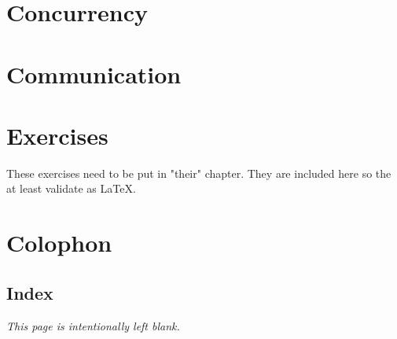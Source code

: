 \documentclass[a4paper,twoside,openleft]{blocksbook}
\begin{document}
\chapter{Concurrency}
\label{chap:channels}


\chapter{Communication}
\label{chap:communication}




\appendix
\chapter{Exercises}
\label{chap:exercises}
These exercises need to be put in "their" chapter. They are included here
so the at least validate as \LaTeX.



\chapter{Colophon}


\begin{twocolumn}
\chapter{Index}
\printindex
\end{twocolumn}
\begin{onecolumn}



\newpage
\thispagestyle{empty}
\begin{center}
\emph{This page is intentionally left blank.}
\end{center}
\end{onecolumn}
\end{document}

